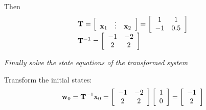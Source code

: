 Then
\[
\begin{array}{l}
 {\bf{T}} = \left[ {\begin{array}{*{20}c}
   {{\bf{x}}_1 } &  \vdots  & {{\bf{x}}_2 }  \\
\end{array}} \right] = \left[ {\begin{array}{*{20}c}
   1 & 1  \\
   { - 1} & {0.5}  \\
\end{array}} \right] \\ 
 {\bf{T}}^{ - 1}  = \left[ {\begin{array}{*{20}c}
   { - 1} & { - 2}  \\
   2 & 2  \\
\end{array}} \right] \\ 
 \end{array}
\]


\emph{Finally solve the state equations of the transformed system} 

Transform the initial states:
\[
{\bf{w}}_0  = {\bf{T}}^{ - 1} {\bf{x}}_0  = \left[ {\begin{array}{*{20}c}
   { - 1} & { - 2}  \\
   2 & 2  \\
\end{array}} \right]\left[ {\begin{array}{*{20}c}
   1  \\
   0  \\
\end{array}} \right] = \left[ {\begin{array}{*{20}c}
   { - 1}  \\
   2  \\
\end{array}} \right]
\]

